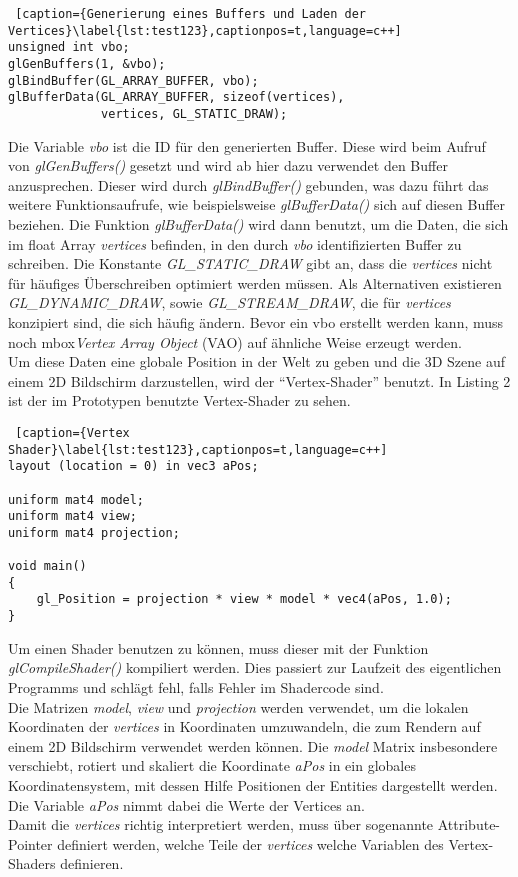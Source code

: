 \documentclass[11pt,a4paper]{article}
\begin{document}
\begin{lstlisting} [caption={Generierung eines Buffers und Laden der Vertices}\label{lst:test123},captionpos=t,language=c++]
unsigned int vbo;
glGenBuffers(1, &vbo);
glBindBuffer(GL_ARRAY_BUFFER, vbo);
glBufferData(GL_ARRAY_BUFFER, sizeof(vertices),
             vertices, GL_STATIC_DRAW);
\end{lstlisting}
\noindent
Die Variable \textit{vbo} ist die ID für den generierten Buffer. Diese wird beim Aufruf von \mbox{\textit{glGenBuffers()}} gesetzt und wird ab hier dazu verwendet den Buffer anzusprechen. Dieser wird durch \mbox{\textit{glBindBuffer()}} gebunden, was dazu führt das weitere Funktionsaufrufe, wie beispielsweise \mbox{\textit{glBufferData()}} sich auf diesen Buffer beziehen. Die Funktion \mbox{\textit{glBufferData()}} wird dann benutzt, um die Daten, die sich im float Array \mbox{\textit{vertices}} befinden, in den durch \mbox{\textit{vbo}} identifizierten Buffer zu schreiben. Die Konstante \mbox{\textit{GL\_STATIC\_DRAW}} gibt an, dass die \mbox{\textit{vertices}} nicht für häufiges Überschreiben optimiert werden müssen. Als Alternativen existieren \mbox{\textit{GL\_DYNAMIC\_DRAW}}, sowie \mbox{\textit{GL\_STREAM\_DRAW}}, die für \mbox{\textit{vertices}} konzipiert sind, die sich häufig ändern. Bevor ein vbo erstellt werden kann, muss noch mbox{\textit{Vertex Array Object}} (VAO) auf ähnliche Weise erzeugt werden.\\
Um diese Daten eine globale Position in der Welt zu geben und die 3D Szene auf einem 2D Bildschirm darzustellen, wird der ``Vertex-Shader'' benutzt. In Listing 2 ist der im Prototypen benutzte Vertex-Shader zu sehen.

\begin{lstlisting} [caption={Vertex Shader}\label{lst:test123},captionpos=t,language=c++]
layout (location = 0) in vec3 aPos;

uniform mat4 model;
uniform mat4 view;
uniform mat4 projection;

void main()
{
	gl_Position = projection * view * model * vec4(aPos, 1.0);
}

\end{lstlisting}
\noindent
Um einen Shader benutzen zu können, muss dieser mit der Funktion \mbox{\textit{glCompileShader()}} kompiliert werden. Dies passiert zur Laufzeit des eigentlichen Programms und schlägt fehl, falls Fehler im Shadercode sind.\\
Die Matrizen \mbox{\textit{model}}, \mbox{\textit{view}} und \mbox{\textit{projection}} werden verwendet, um die lokalen Koordinaten der \mbox{\textit{vertices}} in Koordinaten umzuwandeln, die zum Rendern auf einem 2D Bildschirm verwendet werden können. Die \mbox{\textit{model}} Matrix insbesondere verschiebt, rotiert und skaliert die Koordinate \mbox{\textit{aPos}} in ein globales Koordinatensystem, mit dessen Hilfe Positionen der Entities dargestellt werden. Die Variable \mbox{\textit{aPos}} nimmt dabei die Werte der Vertices an.\\
Damit die \mbox{\textit{vertices}} richtig interpretiert werden, muss über sogenannte Attribute-Pointer definiert werden, welche Teile der \mbox{\textit{vertices}} welche Variablen des Vertex-Shaders definieren.
\end{document}
